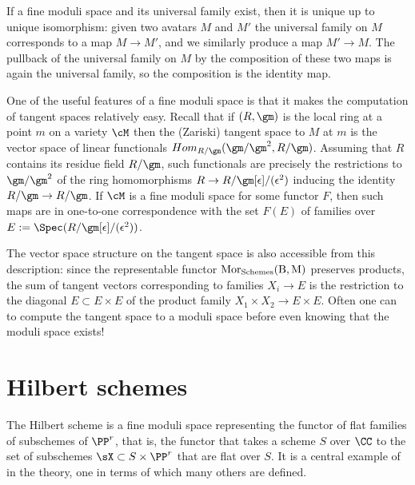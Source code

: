 If a fine moduli space and its universal family exist, then it is unique up to unique isomorphism: given two avatars $M$ and $M'$
the universal family on $M$ corresponds to a map $M\to M'$, and we similarly produce a map $M'\to M$. The pullback of the universal family on $M$ by the composition of these two maps is again the universal family, so the composition is the identity map.

\def\eps{{\epsilon}}
One of the useful features of a fine moduli space is that it makes the computation of tangent spaces relatively easy.
Recall that if $(R,\gm)$ is the local ring at a point $m$ on a variety $\cM$ then the (Zariski) tangent
space to $M$ at $m$ is the vector space of linear functionals $Hom_{R/\gm}(\gm/\gm^2, R/\gm)$.   Assuming that
$R$ contains its residue field $R/\gm$, such functionals
are precisely the restrictions to $\gm/\gm^2$ of the ring homomorphisms $R \to R/\gm[\eps]/(\eps^2)$ inducing the identity
$R/\gm \to R/\gm$. 
 If $\cM$ is a fine moduli space for some functor $F$, then such maps are in one-to-one correspondence
with the set $F(E)$ of families over $E := \Spec(R/\gm[\eps]/(\eps^2))$. 


The vector space structure on the tangent space is also accessible from this description: since the representable
functor $\rm{Mor}_{\rm Schemes}(B, M)$ preserves products, the
 sum of tangent vectors corresponding to families $X_i \to E$ is the restriction to the diagonal
 $E \subset E\times E$
 of the product family $X_1 \times X_2 \to E\times E$.
Often one can to compute the tangent space to a moduli space before even knowing that the moduli space exists!


\section{Hilbert schemes}\label{hilbert scheme section}

The Hilbert scheme is a fine moduli space representing the functor of flat families of subschemes of $\PP^r$,
that is, the functor that takes a scheme $S$ over $\CC$ to the set of subschemes $\sX \subset S\times \PP^r$
that are flat over $S$. It is a central example of in the theory, one in terms of which many others are defined.

